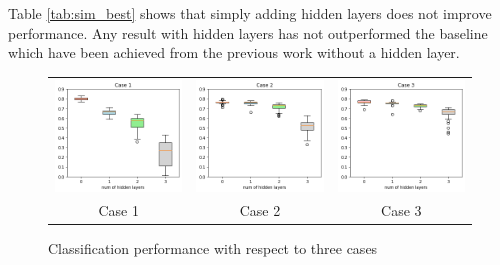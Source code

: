 \documentclass[preprint,12pt]{elsarticle}
\begin{document}
Table \ref{tab:sim_best} shows that simply adding hidden layers does not improve performance. Any result with hidden layers has not outperformed the baseline which have been achieved from the previous work \cite{hopkins2018spiking} without a hidden layer.

\begin{figure}[tbh]
    \centering
    \begin{centering}
    \begin{tabular}{ccc}
        \includegraphics[width=0.30\linewidth, trim=0cm 0cm 0cm 0.65cm, clip=true]{10trials/boxPlotHlayersC1}&
        \includegraphics[width=0.30\linewidth, trim=0cm 0cm 0cm 0.65cm, clip=true]{10trials/boxPlotHlayersC2}&
        \includegraphics[width=0.30\linewidth, trim=0cm 0cm 0cm 0.65cm, clip=true]{10trials/boxPlotHlayersC3}\\
        Case 1 & Case 2 & Case 3
        \end{tabular}
     \end{centering}
     \caption{Classification performance with respect to three cases}
     \label{fig:bpTtime}
    \vspace{-10pt}
\end{figure}
\end{document}
